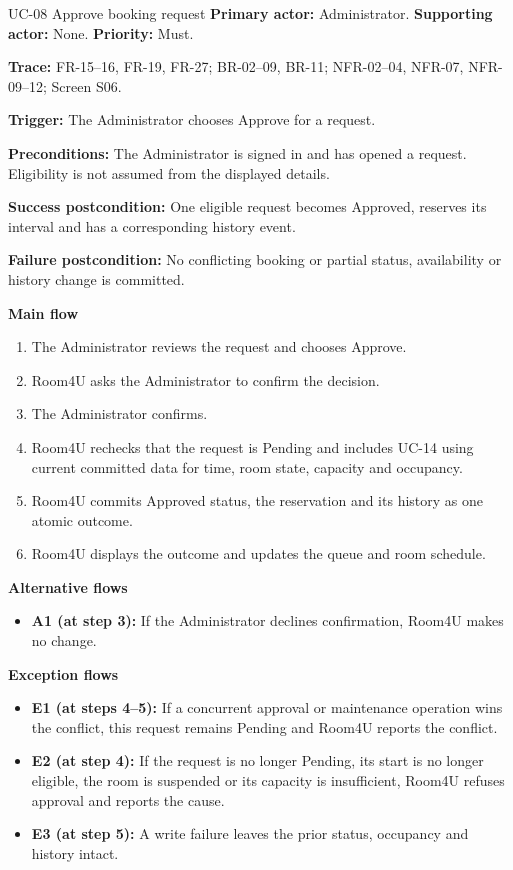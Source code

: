 \begin{usecasebox}{UC-08 Approve booking request}
\noindent\textbf{Primary actor:} Administrator.\quad
\textbf{Supporting actor:} None.\quad
\textbf{Priority:} Must.\par
\textbf{Trace:} FR-15--16, FR-19, FR-27; BR-02--09, BR-11; NFR-02--04, NFR-07, NFR-09--12; Screen S06.\par
\textbf{Trigger:} The Administrator chooses Approve for a request.\par
\textbf{Preconditions:} The Administrator is signed in and has opened a request. Eligibility is not assumed from the displayed details.\par
\textbf{Success postcondition:} One eligible request becomes Approved, reserves its interval and has a corresponding history event.\par
\textbf{Failure postcondition:} No conflicting booking or partial status, availability or history change is committed.\par
\textbf{Main flow}
\begin{enumerate}[label=\arabic*.,leftmargin=2em,itemsep=1pt,topsep=2pt]
  \item The Administrator reviews the request and chooses Approve.
  \item Room4U asks the Administrator to confirm the decision.
  \item The Administrator confirms.
  \item Room4U rechecks that the request is Pending and includes UC-14 using current committed data for time, room state, capacity and occupancy.
  \item Room4U commits Approved status, the reservation and its history as one atomic outcome.
  \item Room4U displays the outcome and updates the queue and room schedule.
\end{enumerate}
\textbf{Alternative flows}
\begin{itemize}[label={},leftmargin=0pt,itemsep=1pt,topsep=1pt]
  \item \textbf{A1 (at step 3):} If the Administrator declines confirmation, Room4U makes no change.
\end{itemize}
\textbf{Exception flows}
\begin{itemize}[label={},leftmargin=0pt,itemsep=1pt,topsep=1pt]
  \item \textbf{E1 (at steps 4--5):} If a concurrent approval or maintenance operation wins the conflict, this request remains Pending and Room4U reports the conflict.
  \item \textbf{E2 (at step 4):} If the request is no longer Pending, its start is no longer eligible, the room is suspended or its capacity is insufficient, Room4U refuses approval and reports the cause.
  \item \textbf{E3 (at step 5):} A write failure leaves the prior status, occupancy and history intact.
\end{itemize}
\end{usecasebox}

